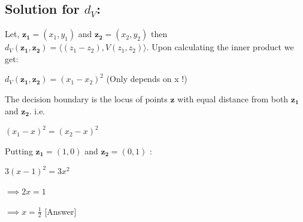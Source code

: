 \documentclass[a4paper,11pt]{article}
\newcommand\tab[1][0.6cm]{\hspace*{#1}}
\begin{document}
\begin{mlsolution}
\subsection*{Solution for $d_V$:}
	Let, $\mathbf{z_1}=(x_1,y_1)$ and $\mathbf{z_2}=(x_2,y_2)$ then $d_V(\mathbf{z_1,z_2}) = \langle(z_1 - z_2),V(z_1,z_2) \rangle$. Upon calculating the inner product we get:
	
	$d_V(\mathbf{z_1,z_2}) = (x_1 - x_2)^2 $ (Only depends on x !)
	
	The decision boundary is the locus of points $\mathbf{z}$ with equal distance from both $\mathbf{z_1}$ and $\mathbf{z_2}$. i.e.
	
\tab $(x_1 - x)^2  = (x_2 - x)^2$

Putting $\mathbf{z_1} = (1,0)$ and $\mathbf{z_2} = (0,1)$ :

\tab $3(x-1)^2  = 3x^2 $

$\implies 2x = 1$

$\implies x = \frac{1}{2}$ [Answer]


\end{mlsolution}
\end{document}
